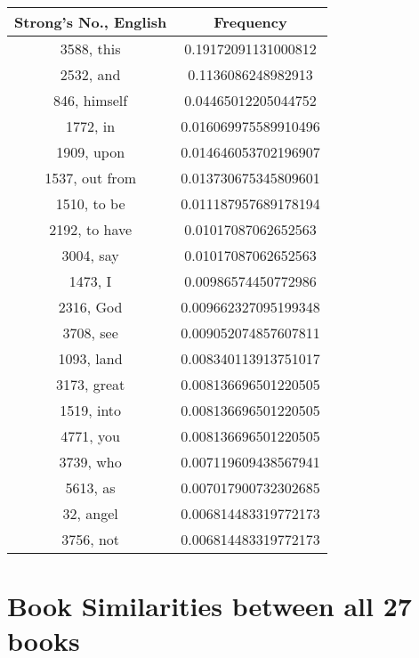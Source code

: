 \documentclass[12pt,letterpaper]{article}
\begin{document}
 \begin{longtable}{|c|c|}
\hline
 Strong's No., English & Frequency \\ \hline  
3588, this & 0.19172091131000812\\ \hline 
 2532, and & 0.1136086248982913\\ \hline 
 846, himself & 0.04465012205044752\\ \hline 
 1772, in & 0.016069975589910496\\ \hline 
 1909, upon & 0.014646053702196907\\ \hline 
 1537, out from & 0.013730675345809601\\ \hline 
 1510, to be & 0.011187957689178194\\ \hline 
 2192, to have & 0.01017087062652563\\ \hline 
 3004, say & 0.01017087062652563\\ \hline 
 1473, I & 0.00986574450772986\\ \hline 
 2316, God & 0.009662327095199348\\ \hline 
 3708, see & 0.009052074857607811\\ \hline 
 1093, land & 0.008340113913751017\\ \hline 
 3173, great & 0.008136696501220505\\ \hline 
 1519, into & 0.008136696501220505\\ \hline 
 4771, you & 0.008136696501220505\\ \hline 
 3739, who & 0.007119609438567941\\ \hline 
 5613, as & 0.007017900732302685\\ \hline 
 32, angel & 0.006814483319772173\\ \hline 
 3756, not & 0.006814483319772173\\ \hline 
\end{longtable} 
 



\newpage
\section{Book Similarities between all 27 books}
\end{document}
